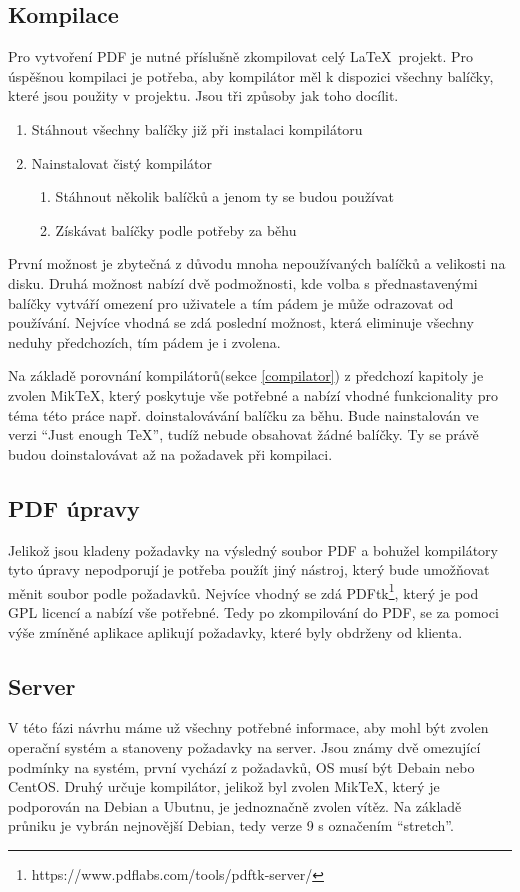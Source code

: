 \subsection{Kompilace}
Pro vytvoření PDF je nutné příslušně zkompilovat celý \LaTeX\ projekt. Pro úspěšnou kompilaci je potřeba, aby kompilátor měl k dispozici všechny balíčky, které jsou použity v projektu. Jsou tři způsoby jak toho docílit.
\begin{enumerate}
	\item Stáhnout všechny balíčky již při instalaci kompilátoru
	\item Nainstalovat čistý kompilátor
		\begin{enumerate}
			\item Stáhnout několik balíčků a jenom ty se budou používat
			\item Získávat balíčky podle potřeby za běhu
		\end{enumerate}
\end{enumerate}
První možnost je zbytečná z důvodu mnoha nepoužívaných balíčků a velikosti na disku. Druhá možnost nabízí dvě podmožnosti, kde volba s přednastavenými balíčky vytváří omezení pro uživatele a tím pádem je může odrazovat od používání. Nejvíce vhodná se zdá poslední možnost, která eliminuje všechny neduhy předchozích, tím pádem je i zvolena.
\par
Na základě porovnání kompilátorů(sekce \ref{compilator}) z předchozí kapitoly je zvolen MikTeX, který poskytuje vše potřebné a nabízí vhodné funkcionality pro téma této práce např. doinstalovávání balíčku za běhu. Bude nainstalován ve verzi \enquote{Just enough TeX}, tudíž nebude obsahovat žádné balíčky. Ty se právě budou doinstalovávat až na požadavek při kompilaci.

\subsection{PDF úpravy}
Jelikož jsou kladeny požadavky na výsledný soubor PDF a bohužel kompilátory tyto úpravy nepodporují je potřeba použít jiný nástroj, který bude umožňovat měnit soubor podle požadavků. Nejvíce vhodný se zdá PDFtk\footnote{https://www.pdflabs.com/tools/pdftk-server/}, který je pod GPL licencí a nabízí vše potřebné. Tedy po zkompilování do PDF, se za pomoci výše zmíněné aplikace aplikují požadavky, které byly obdrženy od klienta.

\subsection{Server}
V této fázi návrhu máme už všechny potřebné informace, aby mohl být zvolen operační systém a stanoveny požadavky na server. Jsou známy dvě omezující podmínky na systém, první vychází z požadavků, OS musí být Debain nebo CentOS. Druhý určuje kompilátor, jelikož byl zvolen MikTeX, který je podporován na Debian a Ubutnu, je jednoznačně zvolen vítěz. Na základě průniku je vybrán nejnovější Debian, tedy verze 9 s označením \enquote{stretch}. 
 



